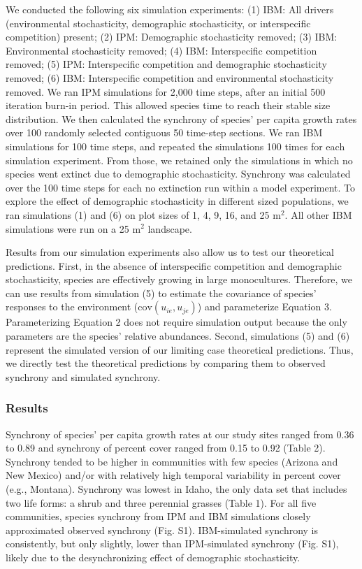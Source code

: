 \documentclass[12pt,]{article}
\begin{document}
We conducted the following six simulation experiments: (1) IBM: All
drivers (environmental stochasticity, demographic stochasticity, or
interspecific competition) present; (2) IPM: Demographic stochasticity
removed; (3) IBM: Environmental stochasticity removed; (4) IBM:
Interspecific competition removed; (5) IPM: Interspecific competition
and demographic stochasticity removed; (6) IBM: Interspecific
competition and environmental stochasticity removed. We ran IPM
simulations for 2,000 time steps, after an initial 500 iteration burn-in
period. This allowed species time to reach their stable size
distribution. We then calculated the synchrony of species' per capita
growth rates over 100 randomly selected contiguous 50 time-step
sections. We ran IBM simulations for 100 time steps, and repeated the
simulations 100 times for each simulation experiment. From those, we
retained only the simulations in which no species went extinct due to
demographic stochasticity. Synchrony was calculated over the 100 time
steps for each no extinction run within a model experiment. To explore
the effect of demographic stochasticity in different sized populations,
we ran simulations (1) and (6) on plot sizes of 1, 4, 9, 16, and 25
\(\text{m}^2\). All other IBM simulations were run on a 25
\(\text{m}^2\) landscape.

Results from our simulation experiments also allow us to test our
theoretical predictions. First, in the absence of interspecific
competition and demographic stochasticity, species are effectively
growing in large monocultures. Therefore, we can use results from
simulation (5) to estimate the covariance of species' responses to the
environment (\(\text{cov}(u_{ie}, u_{je})\)) and parameterize Equation
3. Parameterizing Equation 2 does not require simulation output because
the only parameters are the species' relative abundances. Second,
simulations (5) and (6) represent the simulated version of our limiting
case theoretical predictions. Thus, we directly test the theoretical
predictions by comparing them to observed synchrony and simulated
synchrony.

\subsubsection{Results}\label{results}

Synchrony of species' per capita growth rates at our study sites ranged
from 0.36 to 0.89 and synchrony of percent cover ranged from 0.15 to
0.92 (Table 2). Synchrony tended to be higher in communities with few
species (Arizona and New Mexico) and/or with relatively high temporal
variability in percent cover (e.g., Montana). Synchrony was lowest in
Idaho, the only data set that includes two life forms: a shrub and three
perennial grasses (Table 1). For all five communities, species synchrony
from IPM and IBM simulations closely approximated observed synchrony
(Fig. S1). IBM-simulated synchrony is consistently, but only slightly,
lower than IPM-simulated synchrony (Fig. S1), likely due to the
desynchronizing effect of demographic stochasticity.
\end{document}
